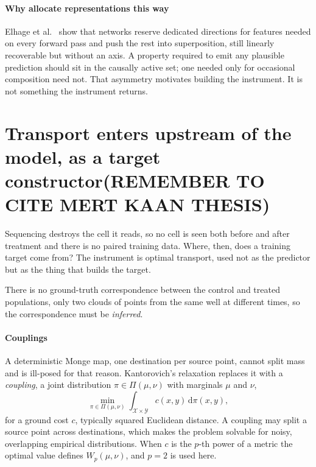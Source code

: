 \paragraph{Why allocate representations this way} Elhage et
al.~\cite{superposition} show that networks reserve dedicated directions for
features needed on every forward pass and push the rest into superposition, still
linearly recoverable but without an axis. A property required to emit any
plausible prediction should sit in the causally active set; one needed only for
occasional composition need not. That asymmetry motivates building the
instrument. It is not something the instrument returns.

\section{Transport enters upstream of the model, as a target constructor(REMEMBER TO CITE MERT KAAN THESIS)}
\label{sec:lit-ot}
\framedecl{-}


\begin{question}
Sequencing destroys the cell it reads, so no cell is seen both before and after
treatment and there is no paired training data. Where, then, does a training
target come from? The instrument is optimal transport, used not as the predictor
but as the thing that builds the target.
\end{question}

\noindent
There is no ground-truth correspondence between the control and treated
populations, only two clouds of points from the same well at different times, so
the correspondence must be \emph{inferred}.

\paragraph{Couplings} A deterministic Monge map, one destination per source
point, cannot split mass and is ill-posed for that reason. Kantorovich's
relaxation replaces it with a \emph{coupling}, a joint distribution
$\pi \in \Pi(\mu,\nu)$ with marginals $\mu$ and $\nu$,
\begin{equation}
  \min_{\pi \in \Pi(\mu,\nu)} \int_{\mathcal{X}\times\mathcal{Y}}
  c(x,y)\,\mathrm{d}\pi(x,y),
\end{equation}
for a ground cost $c$, typically squared Euclidean distance. A coupling may split
a source point across destinations, which makes the problem solvable for noisy,
overlapping empirical distributions. When $c$ is the $p$-th power of a metric the
optimal value defines $W_p(\mu,\nu)$, and $p=2$ is used here.

